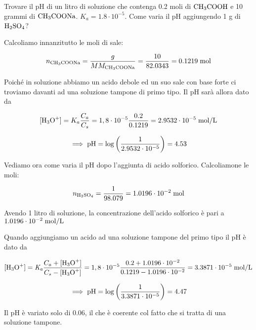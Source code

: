 \begin{esercizio}
    Trovare il pH di un litro di soluzione che contenga 0.2 moli di $\rm CH_3COOH$ e 10 grammi di $\rm CH_3COONa$. $K_a = 1.8 \cdot 10^{-5}$. Come varia il pH aggiungendo 1 g di $\rm H_2SO_4$?
\end{esercizio}
\begin{soluzione}
    Calcoliamo innanzitutto le moli di sale:

$$n_{\rm CH_3COONa}
=\frac{g}{MM_{\rm CH_3COONa}}
=\frac{10}{82.0343}
=0.1219 \; \rm mol$$

Poiché in soluzione abbiamo un acido debole ed un suo sale con base forte ci troviamo davanti ad una soluzione tampone di primo tipo. Il pH sarà allora dato da

$$[\text{H}_3\text{O}^+]
=K_a \frac{C_a}{C_s}
=1,8 \cdot 10^{-5} \frac{0.2}{0.1219}
=2.9532 \cdot 10^{-5} \; \rm mol/L$$

$$\implies \rm pH
=\log{\left( \frac{1}{2.9532 \cdot 10^{-5}} \right)}
=4.53$$

Vediamo ora come varia il pH dopo l'aggiunta di acido solforico. Calcoliamone le moli:

$$n_{\rm H_2SO_4}
=\frac{1}{98.079}
=1.0196 \cdot 10^{-2} \; \rm mol$$

Avendo 1 litro di soluzione, la concentrazione dell'acido solforico è pari a $1.0196 \cdot 10^{-2} \; \rm mol/L$

Quando aggiungiamo un acido ad una soluzione tampone del primo tipo il pH è dato da

$${[\text{H}_3\text{O}^+]}=\textit{K}_\textit{a} \frac{C_a + \rm{[\text{H}_3\text{O}^+]}}{C_s - \rm{[\text{H}_3\text{O}^+]}}
=1,8 \cdot 10^{-5} \frac{0.2 + 1.0196 \cdot 10^{-2}}{0.1219 - 1.0196 \cdot 10^{-2}}
=3.3871 \cdot 10^{-5} \; \rm mol/L$$

$$\implies \rm pH=\log{\left( \frac{1}{3.3871 \cdot 10^{-5}} \right)}=4.47$$

Il pH è variato solo di 0.06, il che è coerente col fatto che si tratta di una soluzione tampone.
\end{soluzione}

\newpage

